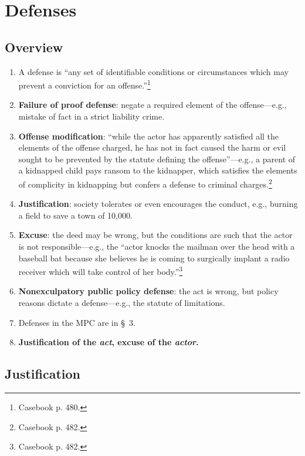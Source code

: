 \section{Defenses}

\subsection{Overview}

\begin{enumerate}
    \item A defense is ``any set of identifiable conditions or circumstances 
    which may prevent a conviction for an offense.''\footnote{Casebook p. 480.}
    \item \textbf{Failure of proof defense}: negate a required element of the 
    offense---e.g., mistake of fact in a strict liability crime.
    \item \textbf{Offense modification}: ``while the actor has apparently 
    satisfied all the elements of the offense charged, he has not in fact 
    caused the harm or evil sought to be prevented by the statute defining the 
    offense''---e.g., a parent of a kidnapped child pays ransom to the 
    kidnapper, which satisfies the elements of complicity in kidnapping but 
    confers a defense to criminal charges.\footnote{Casebook p. 482.}
    \item \textbf{Justification}: society tolerates or even encourages the 
    conduct, e.g., burning a field to save a town of 10,000. 
    \item \textbf{Excuse}: the deed may be wrong, but the conditions are such 
    that the actor is not responsible---e.g., the ``actor knocks the mailman 
    over the head with a baseball bat because she believes he is coming to 
    surgically implant a radio receiver which will take control of her 
    body.''\footnote{Casebook p. 482.}
    \item \textbf{Nonexculpatory public policy defense}: the act is wrong, but 
    policy reasons dictate a defense---e.g., the statute of limitations.
    \item Defenses in the MPC are in \S\ 3.
    \item \textbf{Justification of the \emph{act}, excuse of the \emph{actor}.}
\end{enumerate}

\subsection{Justification}

